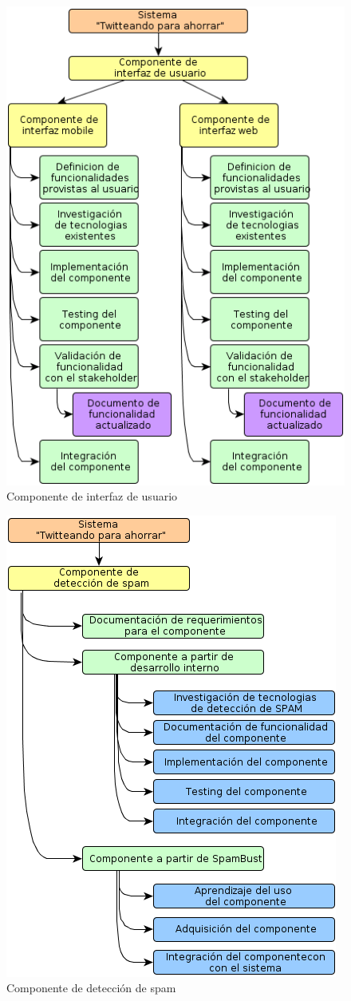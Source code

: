 \begin{figure}[H]
\centering
\includegraphics[scale=\escaladefault]{graficos/wbs/comp_interfaz.png}
\caption{Componente de interfaz de usuario}
\end{figure}

\begin{figure}[H]
\centering
\includegraphics[scale=\escaladefault]{graficos/wbs/comp_de_spam.png}
\caption{Componente de detección de spam}
\end{figure}

